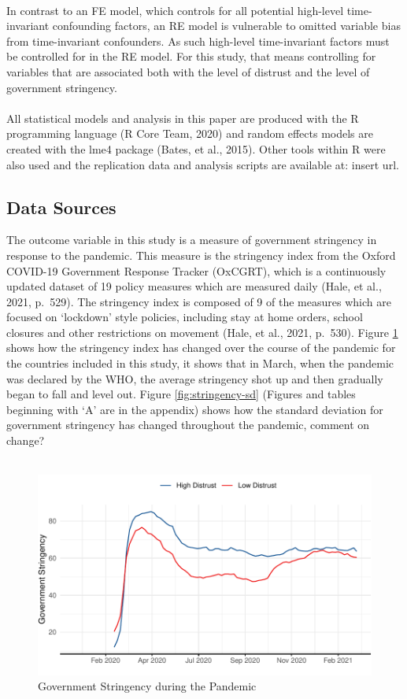 \documentclass[
  11pt,
]{article}
\begin{document}
~\\
In contrast to an FE model, which controls for all potential high-level time-invariant confounding factors, an RE model is vulnerable to omitted variable bias from time-invariant confounders. As such high-level time-invariant factors must be controlled for in the RE model. For this study, that means controlling for variables that are associated both with the level of distrust and the level of government stringency.\\
~\\
All statistical models and analysis in this paper are produced with the R programming language (R Core Team, 2020) and random effects models are created with the lme4 package (Bates, et al., 2015). Other tools within R were also used and the replication data and analysis scripts are available at: insert url.\\

\hypertarget{data-sources}{%
\subsection{Data Sources}\label{data-sources}}

The outcome variable in this study is a measure of government stringency in response to the pandemic. This measure is the stringency index from the Oxford COVID-19 Government Response Tracker (OxCGRT), which is a continuously updated dataset of 19 policy measures which are measured daily (Hale, et al., 2021, p.~529). The stringency index is composed of 9 of the measures which are focused on `lockdown' style policies, including stay at home orders, school closures and other restrictions on movement (Hale, et al., 2021, p.~530). Figure \ref{fig:stringency-plot} shows how the stringency index has changed over the course of the pandemic for the countries included in this study, it shows that in March, when the pandemic was declared by the WHO, the average stringency shot up and then gradually began to fall and level out. Figure \ref{fig:stringency-sd} (Figures and tables beginning with `A' are in the appendix) shows how the standard deviation for government stringency has changed throughout the pandemic, comment on change?\\
~\\

\begin{figure}
\includegraphics[width=0.8\linewidth]{write_up_test_files/figure-latex/stringency-plot-1} \caption{Government Stringency during the Pandemic}\label{fig:stringency-plot}
\end{figure}
\end{document}
